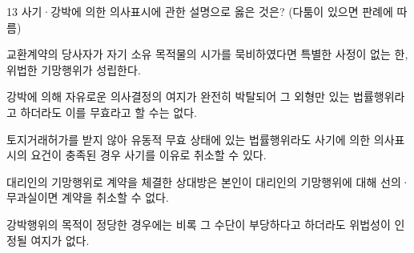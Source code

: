 \begin{question}{13}
사기·강박에 의한 의사표시에 관한 설명으로 옳은 것은? (다툼이 있으면 판례에 따름)
\begin{choices}
  \item 교환계약의 당사자가 자기 소유 목적물의 시가를 묵비하였다면 특별한 사정이 없는 한, 위법한 기망행위가 성립한다.
  \item 강박에 의해 자유로운 의사결정의 여지가 완전히 박탈되어 그 외형만 있는 법률행위라고 하더라도 이를 무효라고 할 수는 없다.
  \item 토지거래허가를 받지 않아 유동적 무효 상태에 있는 법률행위라도 사기에 의한 의사표시의 요건이 충족된 경우 사기를 이유로 취소할 수 있다.
  \item 대리인의 기망행위로 계약을 체결한 상대방은 본인이 대리인의 기망행위에 대해 선의·무과실이면 계약을 취소할 수 없다.
  \item 강박행위의 목적이 정당한 경우에는 비록 그 수단이 부당하다고 하더라도 위법성이 인정될 여지가 없다.
\end{choices}
\end{question}
